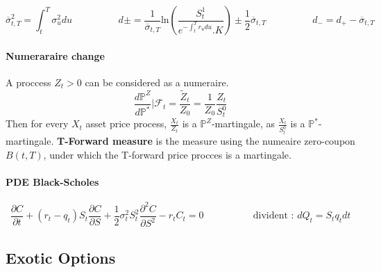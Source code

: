 \documentclass[a4paper,10pt]{article}
\begin{document}
\[
\overline{\sigma}^2_{t,T} = \int^T_t \sigma^2_u du
\hspace{2cm}
d\pm =  \frac{1}{\overline{\sigma}_{t,T}} \text{ln}(\frac{S^1_t}{e^{- \int^T_t r_udu }.K}) \pm \frac{1}{2}\overline{\sigma}_{t,T}
\hspace{2cm}
d_- = d_+  - \overline{\sigma}_{t,T}
\]
\paragraph{Numeraraire change }
A proccess $Z_t > 0$ can be considered as a numeraire. 
\[
\frac{d\mathbb{P}^{Z}}{d\mathbb{P}^*} | \mathcal{F}_t = \frac{\widetilde{Z}_t }{Z_0} = \frac{1}{Z_0} \frac{Z_t}{S^0_t} 
\]
Then for every $X_t$ asset price process, $\frac{X_t}{Z_t}$ is a $\mathbb{P}^Z$-martingale, as $\frac{X_t}{S^0_t}$ is a $\mathbb{P}^*$-martingale. 
\textbf{T-Forward measure } is the measure using the numeaire zero-coupon $B(t,T)$, under which the T-forward price procces is a martingale.

\paragraph{PDE Black-Scholes}
\[
\frac{\partial C}{\partial t} +
(r_t - q_t)S_t \frac{\partial C}{\partial S} + 
\frac{1}{2}\sigma^2_tS^2_t \frac{\partial^2 C}{\partial S^2} -
r_t C_t =0
\hspace{2cm}
\text{ divident : } dQ_t = S_t q_t dt 
\]
\subsection{Exotic Options}
\end{document}
